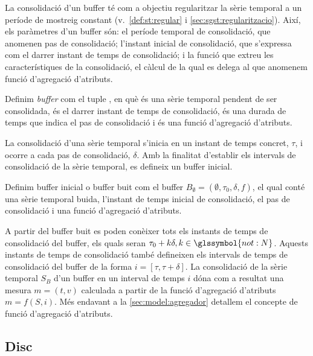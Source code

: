 La consolidació d'un buffer té com a objectiu regularitzar la sèrie
temporal a un període de mostreig constant
(v.~\autoref{def:st:regular} i \autoref{sec:sgst:regularitzacio}).
Així, els paràmetres d'un buffer són: el període temporal de
consolidació, que anomenen pas de consolidació; l'instant inicial de
consolidació, que s'expressa com el darrer instant de temps de
consolidació; i la funció que extreu les
característiques de la consolidació, el càlcul de la qual es delega al
que anomenem funció d'agregació d'atributs.


\begin{definition}[Buffer]
  Definim \emph{buffer} com el tuple
  , en què
   és una sèrie temporal pendent de
  ser consolidada,  és el darrer
  instant de temps de consolidació,
   és una durada de temps que
  indica el pas de consolidació i  és una
  funció d'agregació d'atributs.
\end{definition}

La consolidació d'una sèrie temporal s'inicia en un instant de temps
concret, $\tau$, i ocorre a cada pas de consolidació, $\delta$. Amb la
finalitat d'establir els intervals de consolidació de la sèrie
temporal, es defineix un buffer inicial.

\begin{definition}\label{def:model:buffer_buit}
  Definim buffer inicial o buffer buit com el buffer $B_{\emptyset} =
  (\emptyset,\tau_0, \delta, f)$, el qual conté una sèrie temporal
  buida, l'instant de temps inicial de consolidació, el pas de
  consolidació i una funció d'agregació d'atributs.
\end{definition}

A partir del buffer buit es poden conèixer tots els instants de temps
de consolidació del buffer, els quals seran $\tau_0+k\delta,
k\in\glssymbol{not:N}$. Aquests instants de temps de consolidació
també defineixen els intervals de temps de consolidació del buffer de
la forma $i=[\tau,\tau+\delta]$. La consolidació de la sèrie temporal
$S_B$ d'un buffer en un interval de temps $i$ dóna com a resultat una
mesura $m=(t,v)$ calculada a partir de la funció d'agregació
d'atributs $m = f (S, i)$. Més endavant a la
\autoref{sec:model:agregador} detallem el concepte de funció
d'agregació d'atributs.




\subsection{Disc}\label{sec:model:disc}


